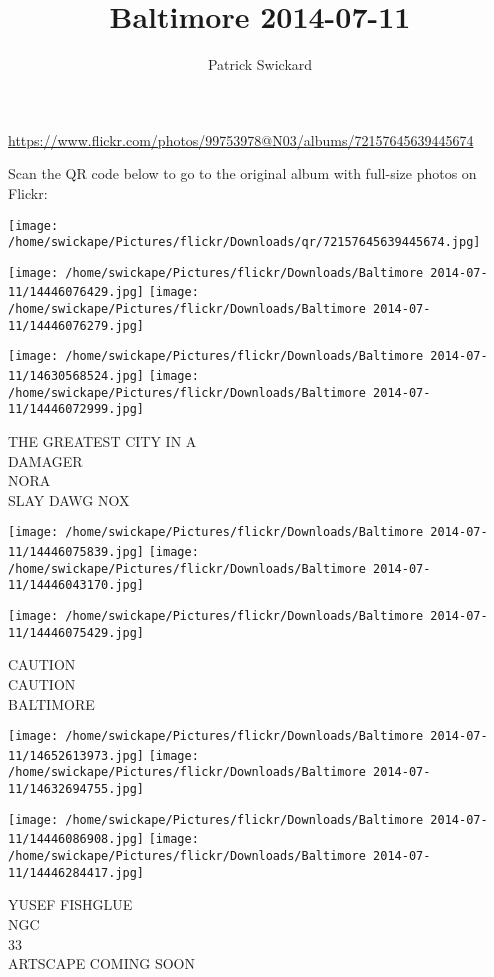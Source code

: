 \documentclass[10pt,letterpaper]{article}
\title{Baltimore 2014-07-11}
\author{Patrick Swickard}
\date{}
\begin{document}
\maketitle

\url{https://www.flickr.com/photos/99753978@N03/albums/72157645639445674}

Scan the QR code below to go to the original album with full-size photos on Flickr:

\texttt{[image: /home/swickape/Pictures/flickr/Downloads/qr/72157645639445674.jpg]}
\pagebreak

\texttt{[image: /home/swickape/Pictures/flickr/Downloads/Baltimore 2014-07-11/14446076429.jpg]}
\texttt{[image: /home/swickape/Pictures/flickr/Downloads/Baltimore 2014-07-11/14446076279.jpg]}

\texttt{[image: /home/swickape/Pictures/flickr/Downloads/Baltimore 2014-07-11/14630568524.jpg]}
\texttt{[image: /home/swickape/Pictures/flickr/Downloads/Baltimore 2014-07-11/14446072999.jpg]}

THE GREATEST CITY IN A\\
DAMAGER\\
NORA\\
SLAY DAWG NOX
\pagebreak

\texttt{[image: /home/swickape/Pictures/flickr/Downloads/Baltimore 2014-07-11/14446075839.jpg]}
\texttt{[image: /home/swickape/Pictures/flickr/Downloads/Baltimore 2014-07-11/14446043170.jpg]}

\vspace{0.25in}
\texttt{[image: /home/swickape/Pictures/flickr/Downloads/Baltimore 2014-07-11/14446075429.jpg]}

CAUTION\\
CAUTION\\
BALTIMORE
\pagebreak

\texttt{[image: /home/swickape/Pictures/flickr/Downloads/Baltimore 2014-07-11/14652613973.jpg]}
\texttt{[image: /home/swickape/Pictures/flickr/Downloads/Baltimore 2014-07-11/14632694755.jpg]}

\texttt{[image: /home/swickape/Pictures/flickr/Downloads/Baltimore 2014-07-11/14446086908.jpg]}
\texttt{[image: /home/swickape/Pictures/flickr/Downloads/Baltimore 2014-07-11/14446284417.jpg]}

YUSEF FISHGLUE\\
NGC\\
33\\
ARTSCAPE COMING SOON
\pagebreak
\end{document}
